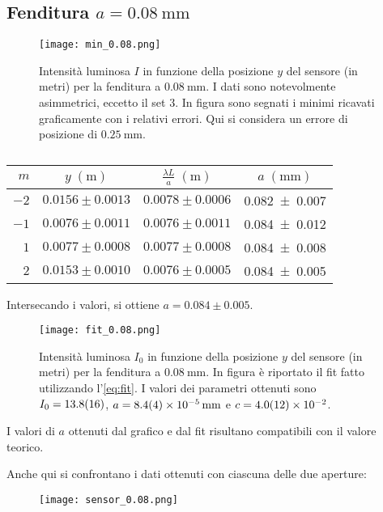 \documentclass[../main.tex]{subfiles}
\begin{document}
\subsection{Fenditura $a = \qty{0.08}{\milli\metre}$}

\begin{figure}[ht!]
    \centering
    \texttt{[image: min\_0.08.png]}
    \caption{Intensità luminosa $I$ in funzione della posizione $y$ del sensore (in metri) per la fenditura a $\qty{0.08}{\mm}$. I dati sono notevolmente asimmetrici, eccetto il set 3. In figura sono segnati i minimi ricavati graficamente con i relativi errori. Qui si considera un errore di posizione di $\qty{0.25}{\mm}$.} %
    \label{fig:minimi 0.08}
\end{figure}

\begin{table}[ht!]
    \centering
    \caption{}
    \begin{tabular}{r|cc|c}
        \toprule
        $m$  & $y \; (\si{\metre})$ & $\frac{\lambda L}{a} \; (\si{\metre})$ & $a \; (\si{\mm})$  \\
        \midrule
        $-2$ & $0.0156 \pm 0.0013$  & $0.0078 \pm 0.0006$                    & \num{0.082+-0.007} \\
        $-1$ & $0.0076 \pm 0.0011$  & $0.0076 \pm 0.0011$                    & \num{0.084+-0.012} \\
        $1$  & $0.0077 \pm 0.0008$  & $0.0077 \pm 0.0008$                    & \num{0.084+-0.008} \\
        $2$  & $0.0153 \pm 0.0010$  & $0.0076 \pm 0.0005$                    & \num{0.084+-0.005} \\
        \bottomrule
    \end{tabular}
    \label{tab:minimi 0.08}
\end{table}

Intersecando i valori, si ottiene $a = 0.084 \pm 0.005$.

\begin{figure}[ht!]
    \centering
    \texttt{[image: fit\_0.08.png]}
    \caption{Intensità luminosa $I_{0}$ in funzione della posizione $y$ del sensore (in metri) per la fenditura a $\qty{0.08}{\mm}$. In figura è riportato il fit fatto utilizzando l'\autoref{eq:fit}. I valori dei parametri ottenuti sono $I_{0} = \num{13.8+-1.6}$, $a = \qty{8.4+-0.4e-5}{\mm}$ e $c = \num{4+-1.2e-2}$.}
    \label{fig:fit 0.08}
\end{figure}

I valori di $a$ ottenuti dal grafico e dal fit risultano compatibili con il valore teorico.

Anche qui si confrontano i dati ottenuti con ciascuna delle due aperture:

\begin{figure}[ht!]
    \centering
    \texttt{[image: sensor\_0.08.png]}
    \caption{}
    \label{fig:sensore 0.08}
\end{figure}
\end{document}
